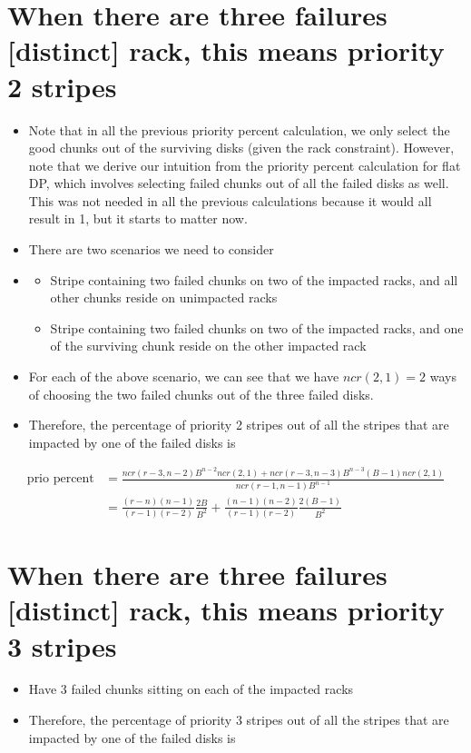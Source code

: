 \documentclass[journal]{IEEEtran}
\begin{document}
\section{When there are three failures [distinct] rack, this means \textbf{priority 2 stripes}}
\begin{itemize}
  \item Note that in all the previous priority percent calculation, we only select the good chunks out of the surviving disks (given the rack constraint). However, note that we derive our intuition from the priority percent calculation for flat DP, which involves selecting failed chunks out of all the failed disks as well. This was not needed in all the previous calculations because it would all result in 1, but it starts to matter now.
  \item There are two scenarios we need to consider
  \item \begin{itemize}
    \item Stripe containing two failed chunks on two of the impacted racks, and all other chunks reside on unimpacted racks
    \item Stripe containing two failed chunks on two of the impacted racks, and one of the surviving chunk reside on the other impacted rack
  \end{itemize}
  \item For each of the above scenario, we can see that we have $ncr(2,1)=2$ ways of choosing the two failed chunks out of the three failed disks.
  \item Therefore, the percentage of priority 2 stripes out of all the stripes that are impacted by one of the failed disks is
\end{itemize}

\begin{equation*}
  \begin{split}
    \text{prio percent}
    & =\frac{ncr(r-3,n-2)B^{n-2}ncr(2,1)+ncr(r-3,n-3)B^{n-3}(B-1)ncr(2,1)}{ncr(r-1,n-1)B^{n-1}}\\
    & =\frac{(r-n)(n-1)}{(r-1)(r-2)}\frac{2B}{B^2}+\frac{(n-1)(n-2)}{(r-1)(r-2)}\frac{2(B-1)}{B^2}
  \end{split}
\end{equation*}

\section{When there are three failures [distinct] rack, this means \textbf{priority 3 stripes}}
\begin{itemize}
  \item Have 3 failed chunks sitting on each of the impacted racks
  \item Therefore, the percentage of priority 3 stripes out of all the stripes that are impacted by one of the failed disks is
\end{itemize}
\end{document}
